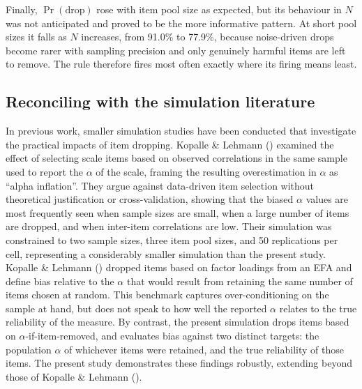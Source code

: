 \documentclass[
  nonatbib,
  authoryear,
  preprint]{elsarticle}
\begin{document}
Finally, \(\Pr(\text{drop})\) rose with item pool size as expected, but
its behaviour in \(N\) was not anticipated and proved to be the more
informative pattern. At short pool sizes it falls as \(N\) increases,
from 91.0\% to 77.9\%, because noise-driven drops become rarer with
sampling precision and only genuinely harmful items are left to remove.
The rule therefore fires most often exactly where its firing means
least.

\subsection{Reconciling with the simulation
literature}\label{reconciling-with-the-simulation-literature}

In previous work, smaller simulation studies have been conducted that
investigate the practical impacts of item dropping. Kopalle \& Lehmann
() examined the effect of
selecting scale items based on observed correlations in the same sample
used to report the \(\alpha\) of the scale, framing the resulting
overestimation in \(\alpha\) as ``alpha inflation''. They argue against
data-driven item selection without theoretical justification or
cross-validation, showing that the biased \(\alpha\) values are most
frequently seen when sample sizes are small, when a large number of
items are dropped, and when inter-item correlations are low. Their
simulation was constrained to two sample sizes, three item pool sizes,
and 50 replications per cell, representing a considerably smaller
simulation than the present study. Kopalle \& Lehmann
() dropped items based on factor
loadings from an EFA and define bias relative to the \(\alpha\) that
would result from retaining the same number of items chosen at random.
This benchmark captures over-conditioning on the sample at hand, but
does not speak to how well the reported \(\alpha\) relates to the true
reliability of the measure. By contrast, the present simulation drops
items based on \(\alpha\)-if-item-removed, and evaluates bias against
two distinct targets: the population \(\alpha\) of whichever items were
retained, and the true reliability of those items. The present study
demonstrates these findings robustly, extending beyond those of Kopalle
\& Lehmann ().
\end{document}

